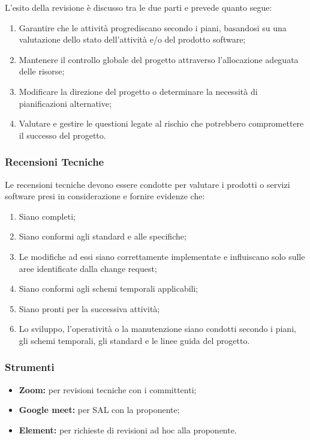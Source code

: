 L'esito della revisione è discusso tra le due parti e prevede quanto segue:

\begin{enumerate}
    \item Garantire che le attività progrediscano secondo i piani, basandosi su una valutazione dello stato dell'attività e/o del prodotto software;
    \item Mantenere il controllo globale del progetto attraverso l'allocazione adeguata delle risorse;
    \item Modificare la direzione del progetto o determinare la necessità di pianificazioni alternative;
    \item Valutare e gestire le questioni legate al rischio che potrebbero compromettere il successo del progetto.
\end{enumerate}

\subsubsection{Recensioni Tecniche}
Le recensioni tecniche devono essere condotte per valutare i prodotti o servizi software presi in considerazione e fornire evidenze che:

\begin{enumerate}
    \item Siano completi;
    \item Siano conformi agli standard e alle specifiche;
    \item Le modifiche ad essi siano correttamente implementate e influiscano solo sulle aree identificate dalla change request;
    \item Siano conformi agli schemi temporali applicabili;
    \item Siano pronti per la successiva attività;
    \item Lo sviluppo, l'operatività o la manutenzione siano condotti secondo i piani, gli schemi temporali, gli standard e le linee guida del progetto.
\end{enumerate}

\subsubsection{Strumenti}

\begin{itemize}
    \item \textbf{Zoom:} per revisioni tecniche con i committenti;
    \item \textbf{Google meet:} per SAL con la proponente; 
    \item \textbf{Element:} per richieste di revisioni ad hoc alla proponente.
\end{itemize}
